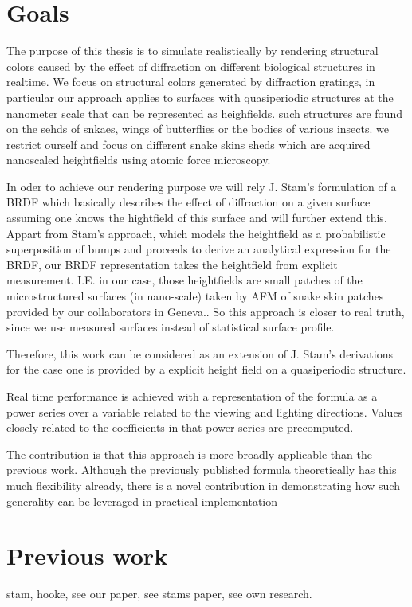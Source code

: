 \section{Goals}
The purpose of this thesis is to simulate realistically by rendering structural colors caused by the effect of diffraction on different biological structures in realtime. We focus on structural colors generated by diffraction gratings, in particular our approach applies to surfaces with quasiperiodic structures at the nanometer scale that can be represented as heighfields. such structures are found on the sehds of snkaes, wings of butterflies or the bodies of various insects. we restrict ourself and focus on different snake skins sheds which are acquired nanoscaled heightfields using atomic force microscopy. 

In oder to achieve our rendering purpose we will rely J. Stam's formulation of a BRDF which basically describes the effect of diffraction on a given surface assuming one knows the hightfield of this surface and will further extend this. Appart from Stam's approach, which models the heightfield as a probabilistic superposition of bumps and proceeds to derive an analytical expression for the BRDF, our BRDF representation takes the heightfield from explicit measurement. 
I.E. in our case, those heightfields are small patches of the microstructured surfaces (in nano-scale) taken by AFM of snake skin patches provided by our collaborators in Geneva..
So this approach is closer to real truth, since we use measured surfaces instead of statistical surface profile.

Therefore, this work can be considered as an extension of J. Stam's derivations for the case one is provided by a explicit height field on a quasiperiodic structure.

Real time performance is achieved with a representation of the formula as a power series over a variable related to the viewing and lighting directions. Values closely related to the coefficients in that power series are precomputed.

The contribution is that this approach is more broadly applicable than the previous work. Although the previously published formula theoretically has this much flexibility already, there is a novel contribution in demonstrating how such generality can be leveraged in practical implementation


\section{Previous work}
stam, hooke, see our paper, see stams paper, see own research.


